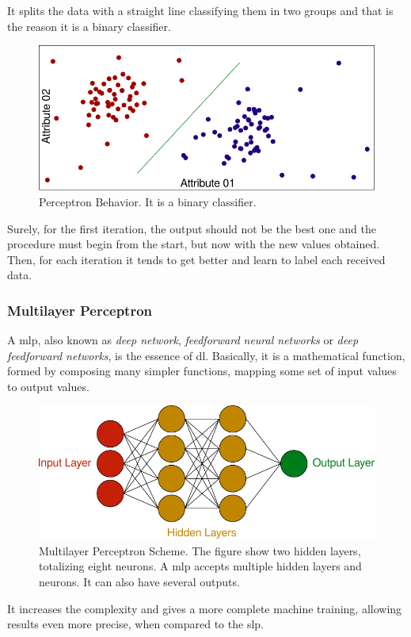 It splits the data with a straight line classifying them in two groups and that is the reason it is a binary classifier.

\begin{figure}[!htb]
    \centering
    \includegraphics{figures/2review/nn/perceptron_charge.pdf}
    \caption[Perceptron Behavior]{Perceptron Behavior. It is a binary classifier.}
\end{figure}

Surely, for the first iteration, the output should not be the best one and the procedure must begin from the start, but now with the new values obtained. Then, for each iteration it tends to get better and learn to label each received data.

\subsubsection*{Multilayer Perceptron}
 
A \gls*{mlp}, also known as \emph{deep network}, \emph{feedforward neural networks} or \emph{deep feedforward networks}, is the essence of \gls*{dl}. Basically, it is a mathematical function, formed by composing many simpler functions, mapping some set of input values to output values.
%
\begin{figure}[!htb]
    \centering
    \includegraphics{figures/2review/nn/mlp.pdf}
    \caption[Multilayer Perceptron Scheme]{Multilayer Perceptron Scheme. The figure show two hidden layers, totalizing eight neurons. A \gls*{mlp} accepts multiple hidden layers and neurons. It can also have several outputs.}
\end{figure}

It increases the complexity and gives a more complete machine training, allowing results even more precise, when compared to the \gls*{slp}.